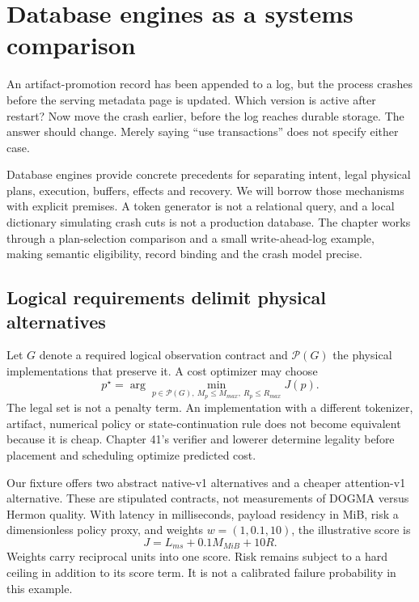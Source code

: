 \chapter{Database engines as a systems comparison}
\label{evod42:chapter}

An artifact-promotion record has been appended to a log, but the process crashes
before the serving metadata page is updated. Which version is active after
restart? Now move the crash earlier, before the log reaches durable storage.
The answer should change. Merely saying ``use transactions'' does not specify
either case.

Database engines provide concrete precedents for separating intent, legal
physical plans, execution, buffers, effects and recovery. We will borrow those
mechanisms with explicit premises. A token generator is not a relational query,
and a local dictionary simulating crash cuts is not a production database.
The chapter works through a plan-selection comparison and a small write-ahead-log
example, making semantic eligibility, record binding and the crash model precise.

\section{Logical requirements delimit physical alternatives}
\label{evod42:plans}
Let $G$ denote a required logical observation contract and
$\mathcal P(G)$ the physical implementations that preserve it. A cost optimizer
may choose
\[
 p^\star=\arg\min_{p\in\mathcal P(G),\ M_p\le M_{max},\ R_p\le R_{max}} J(p).
\]
The legal set is not a penalty term. An implementation with a different
tokenizer, artifact, numerical policy or state-continuation rule does not
become equivalent because it is cheap. Chapter 41's verifier and lowerer
determine legality before placement and scheduling optimize predicted cost.

Our fixture offers two abstract native-v1 alternatives and a cheaper
attention-v1 alternative. These are stipulated contracts, not measurements of
DOGMA versus Hermon quality. With latency in milliseconds, payload residency
in MiB, risk a dimensionless policy proxy, and weights
$w=(1,0.1,10)$, the illustrative score is
\[
 J=L_{ms}+0.1M_{MiB}+10R.
\]
Weights carry reciprocal units into one score. Risk remains subject to a hard
ceiling in addition to its score term. It is not a calibrated failure
probability in this example.

